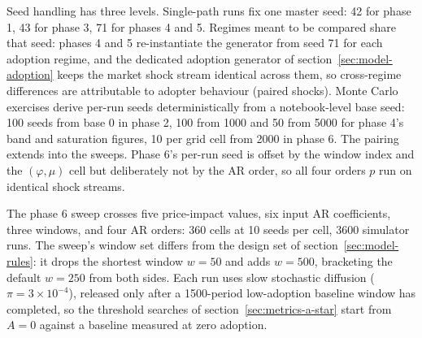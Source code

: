 \documentclass[12pt]{article}
\begin{document}
Seed handling has three levels. Single-path runs fix one master seed: 42 for phase 1, 43 for phase 3, 71 for phases 4 and 5. %
Regimes meant to be compared share that seed: phases 4 and 5 re-instantiate the generator from seed 71 for each adoption regime, and the dedicated adoption generator of section~\ref{sec:model-adoption} keeps the market shock stream identical across them, so cross-regime differences are attributable to adopter behaviour (paired shocks). %
Monte Carlo exercises derive per-run seeds deterministically from a notebook-level base seed: 100 seeds from base 0 in phase 2, 100 from 1000 and 50 from 5000 for phase 4's band and saturation figures, 10 per grid cell from 2000 in phase 6. %
The pairing extends into the sweeps. Phase 6's per-run seed is offset by the window index and the $(\varphi, \mu)$ cell but deliberately not by the AR order, so all four orders $p$ run on identical shock streams. %

The phase 6 sweep crosses five price-impact values, six input AR coefficients, three windows, and four AR orders: 360 cells at 10 seeds per cell, 3600 simulator runs. %
The sweep's window set differs from the design set of section~\ref{sec:model-rules}: it drops the shortest window $w = 50$ and adds $w = 500$, bracketing the default $w = 250$ from both sides. %
Each run uses slow stochastic diffusion ($\pi = 3 \times 10^{-4}$), released only after a 1500-period low-adoption baseline window has completed, so the threshold searches of section~\ref{sec:metrics-a-star} start from $A = 0$ against a baseline measured at zero adoption. %
\end{document}
